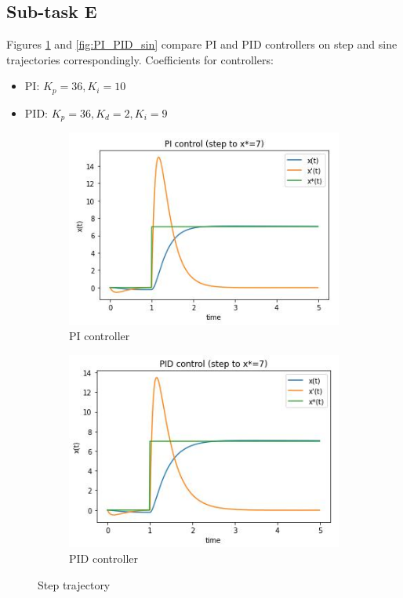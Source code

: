 \documentclass[12pt,letterpaper]{article}
\begin{document}
\newpage
\subsection*{Sub-task E}
    Figures \ref{fig:PI_PID_step} and \ref{fig:PI_PID_sin} compare PI and PID controllers on step and sine trajectories correspondingly.
    Coefficients for controllers:
    \begin{itemize}
        \item PI: $K_p = 36, K_i = 10$
        \item PID: $K_p = 36, K_d = 2, K_i = 9$
    \end{itemize}
    
    \begin{figure}[htb]
        \begin{subfigure}{.5\textwidth}
            \centering
            \includegraphics[width=1\linewidth]{images/output/36_0_10-S7.jpg}
            \caption{PI controller}
        \end{subfigure}
        \begin{subfigure}{.5\textwidth}
          \centering
          \includegraphics[width=1\linewidth]{images/output/36_2_9-S7.jpg}
          \caption{PID controller}
        \end{subfigure}
    \caption{Step trajectory}
    \label{fig:PI_PID_step}
    \end{figure}
    
\end{document}
